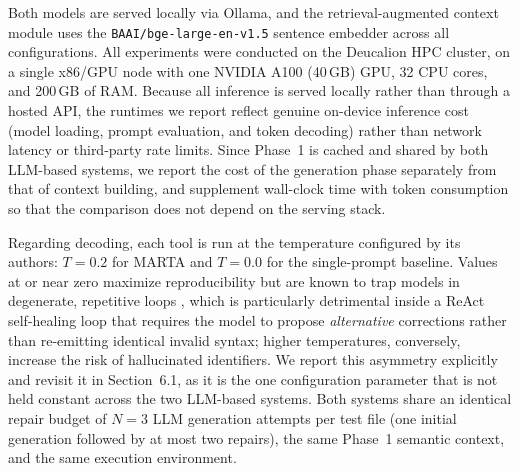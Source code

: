 Both models are served locally via Ollama, and the retrieval-augmented context module
uses the \texttt{BAAI/bge-large-en-v1.5} sentence embedder across all configurations.
All experiments were conducted on the Deucalion HPC cluster, on a single x86/GPU node
with one NVIDIA A100 (40\,GB) GPU, 32 CPU cores, and 200\,GB of RAM. Because all
inference is served locally rather than through a hosted API, the runtimes we report
reflect genuine on-device inference cost (model loading, prompt evaluation, and token
decoding) rather than network latency or third-party rate limits. Since Phase~1 is
cached and shared by both LLM-based systems, we report the cost of the generation phase
separately from that of context building, and supplement wall-clock time with token
consumption so that the comparison does not depend on the serving stack.

Regarding decoding, each tool is run at the temperature configured by its authors:
$T=0.2$ for MARTA and $T=0.0$ for the single-prompt baseline. Values at or near zero
maximize reproducibility but are known to trap models in degenerate, repetitive
loops \cite{holtzman2020curious}, which is particularly detrimental inside a ReAct
self-healing loop that requires the model to propose \emph{alternative} corrections
rather than re-emitting identical invalid syntax; higher temperatures, conversely,
increase the risk of hallucinated identifiers. We report this asymmetry explicitly
and revisit it in Section~6.1, as it is the one configuration parameter that is not
held constant across the two LLM-based systems. Both systems share an identical
repair budget of $N=3$ LLM generation attempts per test file (one initial generation
followed by at most two repairs), the same Phase~1 semantic context, and the same
execution environment.


